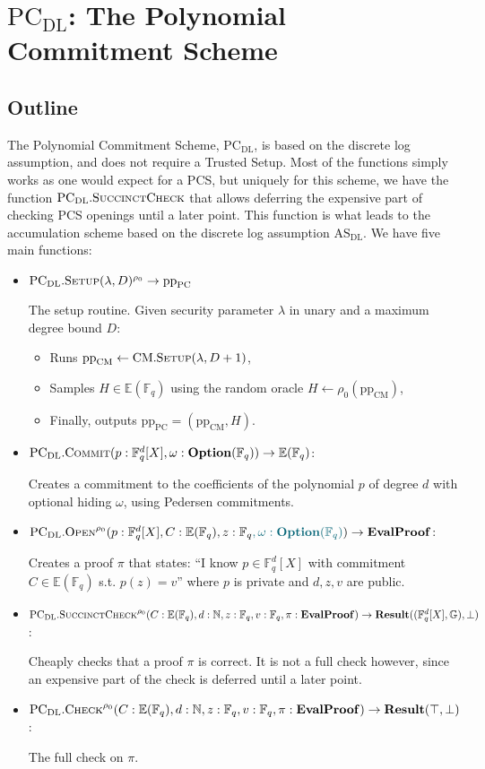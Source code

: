 \documentclass[
]{article}
\providecommand{\tightlist}{%
  \setlength{\itemsep}{0pt}\setlength{\parskip}{0pt}}
\newcommand*\Fb{\mathbb{F}}
\newcommand*\Nb{\mathbb{N}}
\newcommand*\Eb{\mathbb{E}}
\newcommand*\Gb{\mathbb{G}}
\renewcommand*\l{\lambda}
\renewcommand*\o{\omega}
\newcommand{\mathblue}[1]{\mathcolor{GbBlueDk}{#1}}
\newcommand*{\from}{\gets}
\newcommand*{\pp}{\mathrm{pp}}
\newcommand*{\Setup}{\mathrm{\text{S{\scriptsize ETUP}}}}
\newcommand*{\Commit}{\mathrm{\text{C{\scriptsize OMMIT}}}}
\newcommand*{\PC}{\text{PC}}
\newcommand*{\PCDL}{\text{PC}_{\text{DL}}}
\newcommand*{\PCDLSetup}{\PCDL.\Setup}
\newcommand*{\PCDLCommit}{\PCDL.\Commit}
\newcommand*{\PCDLOpen}{\PCDL.\mathrm{\text{O\scriptsize PEN}}}
\newcommand*{\PCDLSuccinctCheck}{\PCDL.\mathrm{\text{S{\scriptsize UCCINCT}C{\scriptsize HECK}}}}
\newcommand*{\PCDLCheck}{\PCDL.\mathrm{\text{C\scriptsize HECK}}}
\newcommand*{\ASDL}{\text{AS}_{\text{DL}}}
\newcommand*{\CM}{\mathrm{\text{CM}}}
\newcommand*{\CMSetup}{\CM.\Setup}
\newcommand*\Result{\mathbf{Result}}
\newcommand*\Option{\mathbf{Option}}
\newcommand*\EvalProof{\mathbf{EvalProof}}
\begin{document}
\newpage

\section{\texorpdfstring{\(\PCDL\): The Polynomial Commitment
Scheme}{\textbackslash PCDL: The Polynomial Commitment Scheme}}\label{pcdl-the-polynomial-commitment-scheme}

\subsection{Outline}\label{outline}

The Polynomial Commitment Scheme, \(\PCDL\), is based on the discrete
log assumption, and does not require a Trusted Setup. Most of the
functions simply works as one would expect for a PCS, but uniquely for
this scheme, we have the function \(\PCDLSuccinctCheck\) that allows
deferring the expensive part of checking PCS openings until a later
point. This function is what leads to the accumulation scheme based on
the discrete log assumption \(\ASDL\). We have five main functions:

\begin{itemize}
\item
  \(\PCDLSetup(\l, D)^{\rho_0} \to \pp_\PC\)

  The setup routine. Given security parameter \(\l\) in unary and a
  maximum degree bound \(D\):

  \begin{itemize}
  \tightlist
  \item
    Runs \(\pp_\CM \from \CMSetup(\l, D + 1)\),
  \item
    Samples \(H \in \Eb(\Fb_q)\) using the random oracle
    \(H \from \rho_0(\pp_\CM)\),
  \item
    Finally, outputs \(\pp_\PC = (\pp_\CM, H)\).
  \end{itemize}
\item
  \(\PCDLCommit(p: \Fb^d_q[X]{, \o: \Option(\Fb_q)}) \to \Eb(\Fb_q)\):

  Creates a commitment to the coefficients of the polynomial \(p\) of
  degree \(d\) with optional hiding \(\o\), using Pedersen commitments.
\item
  \(\PCDLOpen^{\rho_0}(p: \Fb^d_q[X], C: \Eb(\Fb_q), z: \Fb_q\mathblue{, \o: \Option(\Fb_q)}) \to \EvalProof\):

  Creates a proof \(\pi\) that states: ``I know \(p \in \Fb^d_q[X]\)
  with commitment \(C \in \Eb(\Fb_q)\) s.t. \(p(z) = v\)'' where \(p\)
  is private and \(d, z, v\) are public.
\item
  \(\PCDLSuccinctCheck^{\rho_0}(C: \Eb(\Fb_q), d: \Nb, z: \Fb_q, v: \Fb_q, \pi: \EvalProof) \to \Result((\Fb^d_q[X], \Gb), \bot)\):

  Cheaply checks that a proof \(\pi\) is correct. It is not a full check
  however, since an expensive part of the check is deferred until a
  later point.
\item
  \(\PCDLCheck^{\rho_0}(C: \Eb(\Fb_q), d: \Nb, z: \Fb_q, v: \Fb_q, \pi: \EvalProof) \to \Result(\top, \bot)\):

  The full check on \(\pi\).
\end{itemize}
\end{document}
